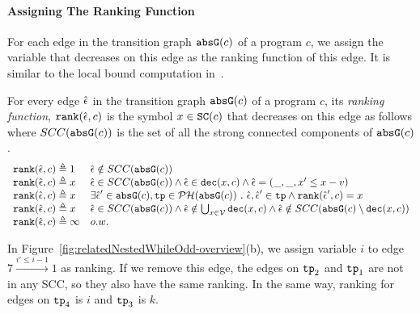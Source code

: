  \paragraph{Assigning The Ranking Function}
 For each edge in the transition graph $\mathtt{abs}{\mathtt{G}}(c)$ of a program $c$,
 we assign the variable that decreases on this edge as the ranking function of this edge.
 It is similar to the local bound computation in~\cite{SinnZV17}.
 \begin{defn}
 \label{def:ranking_gen}
 For every edge $\hat{\mathtt{\epsilon}{}}$ in the transition graph $\mathtt{abs}{\mathtt{G}}(c)$ of a program $c$,
 its \emph{ranking function}, $\mathtt{rank}(\hat{\mathtt{\epsilon}{}}, c)$
 is the symbol $x\in \mathtt{SC}(c)$ that decreases on this edge as follows where $SCC(\mathtt{abs}{\mathtt{G}}(c))$ is the set of all the strong connected components of $\mathtt{abs}{\mathtt{G}}(c)$.
{\small
\[ 
\begin{array}{ll}
 \mathtt{rank}(\hat{\mathtt{\epsilon}{}}, c) \triangleq 1 
 & \hat{\mathtt{\epsilon}{}} \notin SCC(\mathtt{abs}{\mathtt{G}}(c))
 \\
 \mathtt{rank}(\hat{\mathtt{\epsilon}{}}, c) \triangleq x
 & \hat{\mathtt{\epsilon}{}} \in SCC(\mathtt{abs}{\mathtt{G}}(c)) \land \hat{\mathtt{\epsilon}{}} \in \mathtt{dec}(x, c) \land \hat{\mathtt{\epsilon}{}} = (\_, \_ , x' \leq x - v) \\
 \mathtt{rank}(\hat{\mathtt{\epsilon}{}}, c) \triangleq x
 & \exists \hat{\mathtt{\epsilon}{}}' \in \mathtt{abs}{\mathtt{G}}(c), \mathtt{tp} \in \mathcal{PH}( \mathtt{abs}{\mathtt{G}}(c)) ~.~ \hat{\mathtt{\epsilon}{}}, \hat{\mathtt{\epsilon}{}}' \in \mathtt{tp} \land \mathtt{rank}(\hat{\mathtt{\epsilon}{}}', c) = x \\
 \mathtt{rank}(\hat{\mathtt{\epsilon}{}}, c) \triangleq x
 & \hat{\mathtt{\epsilon}{}} \in SCC(\mathtt{abs}{\mathtt{G}}(c)) \land 
 \hat{\mathtt{\epsilon}{}} \notin \bigcup_{x \in \mathcal{V}} \mathtt{dec}(x, c)
 \land \hat{\mathtt{\epsilon}{}} \notin SCC(\mathtt{abs}{\mathtt{G}}(c) \setminus \mathtt{dec}(x, c))\\
 \mathtt{rank}(\hat{\mathtt{\epsilon}{}}, c) \triangleq \infty
 & o.w.
\end{array}
\]
}
 \end{defn}
 In Figure~\ref{fig:relatedNestedWhileOdd-overview}(b), we assign variable $i$ to edge $7 \xrightarrow{i' \leq i - 1} 1$ as ranking.
 If we remove this edge, the edges on $\mathtt{tp}_2$ and $\mathtt{tp}_1$ are not in any SCC, so they also have the same ranking.
In the same way, ranking for edges on $\mathtt{tp}_4$ is $i$ and $\mathtt{tp}_3$ is $k$.
